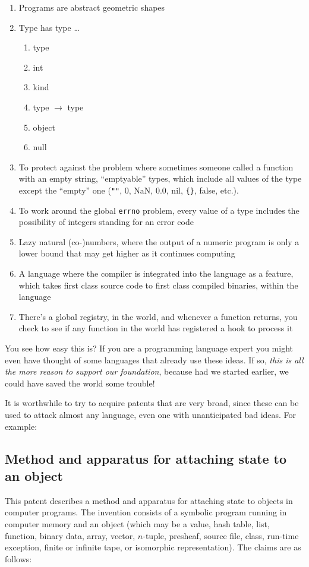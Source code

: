 \documentclass[acmtocl]%
{boviktrans}
\begin{document}
\begin{enumerate}
\item Programs are abstract geometric shapes
\item Type has type \ldots
  \begin{enumerate}
    \item type
    \item int
    \item kind
    \item type $\rightarrow$ type
    \item object
    \item null
  \end{enumerate}
\item To protect against the problem where sometimes someone called a function with an empty string, ``emptyable'' types, which include all values of the type except the ``empty'' one (\verb+""+, 0, NaN, 0.0, nil, \verb+{}+, false, etc.).
\item To work around the global {\tt errno} problem, every value of a type includes the possibility of integers standing for an error code
\item Lazy natural (co-)numbers, where the output of a numeric program is only a lower bound that may get higher as it continues computing
\item A language where the compiler is integrated into the language as a feature, which takes first class source code to first class compiled binaries, within the language
\item There's a global registry, in the world, and whenever a function returns, you check to see if any function in the world has registered a hook to process it
\end{enumerate}

You see how easy this is? If you are a programming language expert you
might even have thought of some languages that already use these
ideas. If so, {\it this is all the more reason to support our
  foundation}, because had we started earlier, we could have saved the
world some trouble!

It is worthwhile to try to acquire patents that are very broad, since
these can be used to attack almost any language, even one with
unanticipated bad ideas. For example:


\subsection{Method and apparatus for attaching state to an object}

This patent describes a method and apparatus for attaching state to
objects in computer programs. The invention consists of a symbolic
program running in computer memory and an object (which may be a value,
hash table, list, function, binary data, array, vector, $n$-tuple,
presheaf, source file, class, run-time exception, finite or infinite
tape, or isomorphic representation). The claims are as follows:
\end{document}
